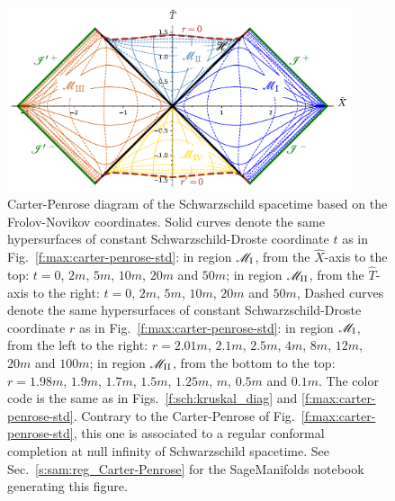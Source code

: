 \begin{figure}
\centerline{\includegraphics[width=0.9\textwidth]{max_carter-penrose-FN.pdf}}
\caption[]{\label{f:max:carter-penrose-FN} \footnotesize
Carter-Penrose diagram of the Schwarzschild spacetime based on the Frolov-Novikov coordinates.
Solid curves denote the same hypersurfaces of constant Schwarzschild-Droste coordinate
$t$ as in Fig.~\ref{f:max:carter-penrose-std}: in region $\mathscr{M}_{\rm I}$, from the $\hat{X}$-axis to the top: $t=0$, $2m$,
$5m$, $10m$, $20m$ and $50m$;
in region $\mathscr{M}_{\rm II}$, from the $\hat{T}$-axis
to the right: $t=0$, $2m$, $5m$, $10m$, $20m$ and $50m$,
Dashed curves denote the same hypersurfaces of constant Schwarzschild-Droste coordinate
$r$ as in Fig.~\ref{f:max:carter-penrose-std}: in region $\mathscr{M}_{\rm I}$, from the left to the right: $r=2.01m$, $2.1m$, $2.5m$, $4m$, $8m$, $12m$, $20m$ and $100m$;
in region $\mathscr{M}_{\rm II}$, from the bottom to the top: $r=1.98m$, $1.9m$, $1.7m$,
$1.5m$, $1.25m$, $m$, $0.5m$ and $0.1m$.
The color code
is the same as in Figs.~\ref{f:sch:kruskal_diag} and \ref{f:max:carter-penrose-std}.
Contrary to the Carter-Penrose of Fig.~\ref{f:max:carter-penrose-std}, this one is
associated to a regular conformal completion at null infinity of Schwarzschild spacetime. See Sec.~\ref{s:sam:reg_Carter-Penrose} for the
SageManifolds notebook generating this figure.}
\end{figure}



